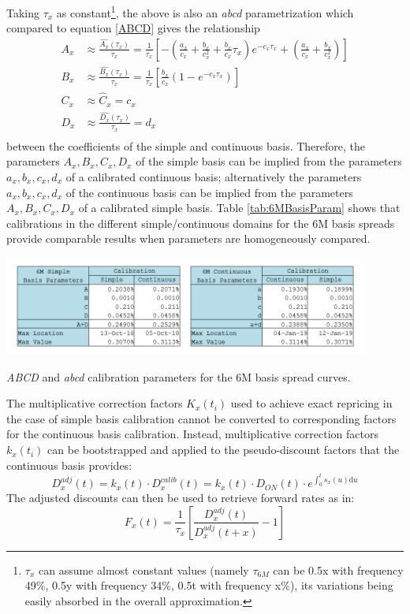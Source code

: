 \documentclass{article}
\begin{document}
Taking $\tau_x$ as constant\footnote{$\tau_x$ can assume almost constant values (namely $\tau_{6M}$ can be 0.5x with frequency 49\%, 0.5y with frequency 34\%, 0.5t with frequency x\%), its variations being easily absorbed in the overall approximation.}, the above is also an \textit{abcd} parametrization which compared to equation \ref{ABCD} gives the relationship
\begin{equation}
\begin{split}
A_x &\approx \frac{\hat{A_x}(\tau_x)}{\tau_x} 
    = \frac{1}{\tau_x} \left[ -\left(\frac{a_x}{c_x}+ \frac{b_x}{c_x^{2}}+\frac{b_x}{c_x}\tau_x \right)e^{-c_x \tau_x}+\left(\frac{a_x}{c_x}+ \frac{b_x}{c_x^{2}}\right) \right] \\
B_x &\approx \frac{\hat{B_x}(\tau_x)}{\tau_x} 
    = \frac{1}{\tau_x} \left[ \frac{b_x}{c_x}\left(1-e^{-c_x \tau_x}\right) \right]\\
C_x &\approx \hat{C}_x = c_x        \\
D_x &\approx \frac{\hat{D_x}(\tau_x)}{\tau_x} = d_x \\
\end{split}
\end{equation}
between the coefficients of the simple and continuous basis. Therefore, the parameters $A_x, B_x, C_x, D_x$ of the simple basis can be implied from the parameters $a_x, b_x, c_x, d_x$ of a calibrated continuous basis; alternatively the parameters $a_x, b_x, c_x, d_x$ of the continuous basis can be implied from the parameters $A_x, B_x, C_x, D_x$ of a calibrated simple basis. Table \ref{tab:6MBasisParam} shows that calibrations in the different simple/continuous domains for the 6M basis spreads provide comparable results when parameters are homogeneously compared.

\begin{table}
\centering
\includegraphics[width=0.9\textwidth]{6MSimple&ContBasisParam.png}
\caption{\textit{ABCD} and \textit{abcd} calibration parameters for the 6M basis spread curves.}
\label{tab:6MBasisParam}
\end{table}

The multiplicative correction factors $K_x(t_i)$ used to achieve exact repricing in the case of simple basis calibration cannot be converted to corresponding factors for the continuous basis calibration. Instead, multiplicative correction factors $k_x(t_i)$ can be bootstrapped and applied to the pseudo-discount factors that the continuous basis provides:
\begin{equation}
D_x^{adj}(t) = k_x(t) \cdot D_x^{calib}(t) = k_x(t) \cdot D_{ON}(t) \cdot e^{\int_0^{t} s_x(u) \mathrm{d}u}
\end{equation}
The adjusted discounts can then be used to retrieve forward rates as in:
\begin{equation}
F_x(t) = \frac{1}{\tau_x} \left[\frac{D^{adj}_x(t)}{D^{adj}_x(t+x)} - 1 \right]
\end{equation}
\end{document}
